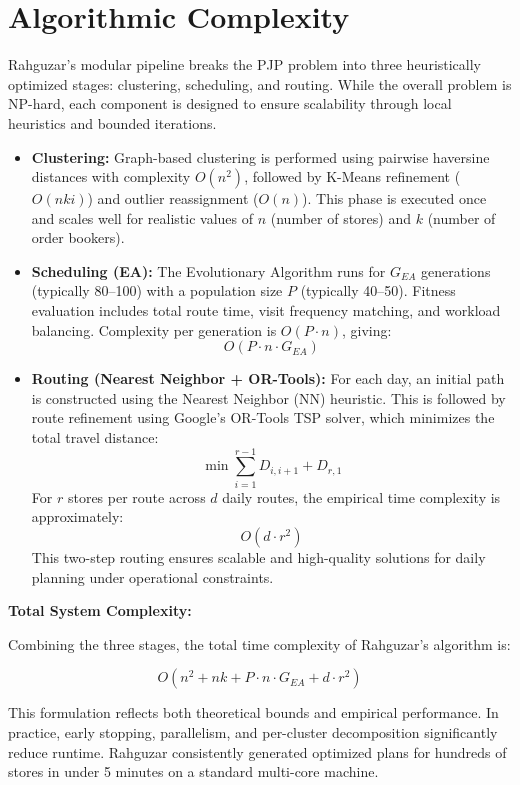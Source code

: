 
\section{Algorithmic Complexity}

Rahguzar’s modular pipeline breaks the PJP problem into three heuristically optimized stages: clustering, scheduling, and routing. While the overall problem is NP-hard, each component is designed to ensure scalability through local heuristics and bounded iterations.

\begin{itemize}
  \item \textbf{Clustering:} Graph-based clustering is performed using pairwise haversine distances with complexity $O(n^2)$, followed by K-Means refinement ($O(nki)$) and outlier reassignment ($O(n)$). This phase is executed once and scales well for realistic values of $n$ (number of stores) and $k$ (number of order bookers).

  \item \textbf{Scheduling (EA):} The Evolutionary Algorithm runs for $G_{EA}$ generations (typically 80–100) with a population size $P$ (typically 40–50). Fitness evaluation includes total route time, visit frequency matching, and workload balancing. Complexity per generation is $O(P \cdot n)$, giving:
  \[
  O(P \cdot n \cdot G_{EA})
  \]

  \item \textbf{Routing (Nearest Neighbor + OR-Tools):} For each day, an initial path is constructed using the Nearest Neighbor (NN) heuristic. This is followed by route refinement using Google's OR-Tools TSP solver, which minimizes the total travel distance:
\[
\min \sum_{i=1}^{r-1} D_{i,i+1} + D_{r,1}
\]
For $r$ stores per route across $d$ daily routes, the empirical time complexity is approximately:
\[
O(d \cdot r^2)
\]
This two-step routing ensures scalable and high-quality solutions for daily planning under operational constraints.
\end{itemize}

\textbf{Total System Complexity:}

Combining the three stages, the total time complexity of Rahguzar’s algorithm is:

\[
O(n^2 + nk + P \cdot n \cdot G_{EA} + d \cdot r^2)
\]
  

This formulation reflects both theoretical bounds and empirical performance. In practice, early stopping, parallelism, and per-cluster decomposition significantly reduce runtime. Rahguzar consistently generated optimized plans for hundreds of stores in under 5 minutes on a standard multi-core machine.
